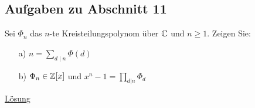 \subsection{Aufgaben zu Abschnitt 11}

\begin{exe}\label{aufgabe:11.1}
	Sei $ \Phi_n $ das $ n $-te Kreisteilungspolynom über $ \mathbb{C} $ und $ n \geq 1 $.
	Zeigen Sie:
	\begin{enumerate}
		\item[a)]
		$ n = \sum \limits_{d \mid n} \Phi(d)$
		
		\item[b)] 
		$\Phi_n \in \mathbb{Z}[x]$ und $x^n - 1 = \prod_{d | n } \Phi_d$
	\end{enumerate}
	\hyperlink{loes:11.1}{Lösung}
\end{exe}